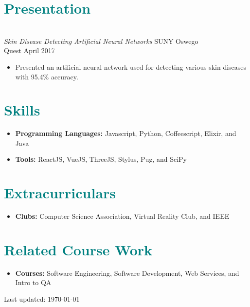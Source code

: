 \documentclass[11pt]{article}
\begin{document}
\section*{\textcolor{teal}{Presentation}}
\hline
\vspace{4px}
\hfill \\
\textit{
    \normalsize{Skin Disease Detecting Artificial Neural Networks}
}
\hfill
\small{SUNY Oswego} \\
\small{Quest}
\hfill
April 2017 
\begin{itemize}
    \item Presented an artificial neural network used for detecting various skin diseases with 95.4\% accuracy.
\end{itemize}

\section*{\textcolor{teal}{Skills}}
\hline
\hfill
\begin{itemize}
    \item \textbf{Programming Languages:} Javascript, Python, Coffeescript, Elixir, and Java 
    \item \textbf{Tools:} ReactJS, VueJS, ThreeJS, Stylus, Pug, and SciPy
\end{itemize}

\section*{\textcolor{teal}{Extracurriculars}}
\hline
\vspace{2px}
\begin{itemize}
    \item \textbf{Clubs:} Computer Science Association, Virtual Reality Club, and IEEE
\end{itemize}

\section*{\textcolor{teal}{Related Course Work}}
\hline
\vspace{2px}
\begin{itemize}
    \item \textbf{Courses:} \small{Software Engineering, Software Development, Web Services, and Intro to QA}
\end{itemize}

\begin{center}
  \begin{footnotesize}
    Last updated: \today \\
  \end{footnotesize}
\end{center}

\setlength{\footskip}{0pt}

\end{document}
